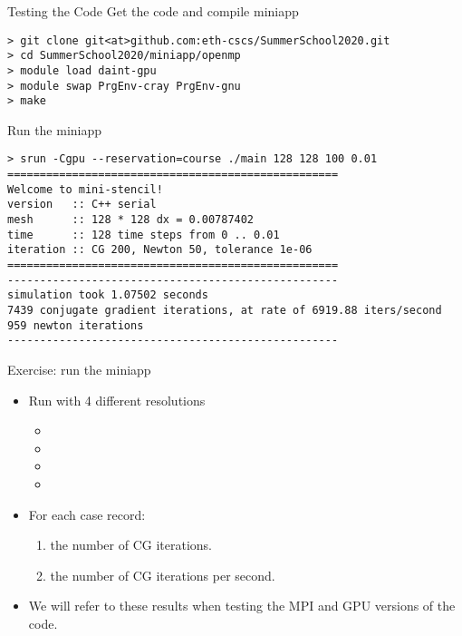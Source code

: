 \documentclass[aspectratio=43]{beamer}
\begin{document}
\begin{frame}[fragile]{Testing the Code}
    Get the code and compile miniapp
\begin{lstlisting}[style=terminal]
> git clone git<at>github.com:eth-cscs/SummerSchool2020.git
> cd SummerSchool2020/miniapp/openmp
> module load daint-gpu
> module swap PrgEnv-cray PrgEnv-gnu
> make
\end{lstlisting}
    Run the miniapp
\begin{lstlisting}[style=terminal]
> srun -Cgpu --reservation=course ./main 128 128 100 0.01
===================================================
Welcome to mini-stencil!
version   :: C++ serial
mesh      :: 128 * 128 dx = 0.00787402
time      :: 128 time steps from 0 .. 0.01
iteration :: CG 200, Newton 50, tolerance 1e-06
===================================================
---------------------------------------------------
simulation took 1.07502 seconds
7439 conjugate gradient iterations, at rate of 6919.88 iters/second
959 newton iterations
---------------------------------------------------
\end{lstlisting}
\end{frame}

\begin{frame}[fragile]{Exercise: run the miniapp}
    \begin{itemize}
        \item Run with 4 different resolutions
        \begin{itemize}
            \item {}
            \item {}
            \item {}
            \item {}
        \end{itemize}
        \item For each case record:
        \begin{enumerate}
            \item the number of CG iterations.
            \item the number of CG iterations per second.
        \end{enumerate}
        \item We will refer to these results when testing the MPI and GPU versions of the code.
    \end{itemize}
\end{frame}
\end{document}
